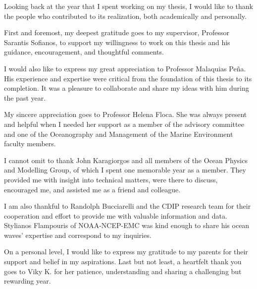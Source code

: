 \documentclass[
11pt, %
greek,english,%
singlespacing, %
headsepline, %
]{MastersDoctoralThesis} %
\begin{document}




\begin{acknowledgements}
\addchaptertocentry{\acknowledgementname} %
Looking back at the year that I spent working on my thesis, I would like to thank the people who contributed to its realization, both academically and personally.

First and foremost, my deepest gratitude goes to my supervisor, Professor Sarantis Sofianos, to support my willingness to work on this thesis and his guidance, encouragement, and thoughtful comments.

I would also like to express my great appreciation to Professor Malaquias  Peña. His experience and expertise were critical from the foundation of this thesis to its completion. It was a pleasure to collaborate and share my ideas with him during the past year.

My sincere appreciation goes to Professor Helena Floca. She was always present and helpful when I needed her support as a member of the advisory committee and one of the Oceanography and Management of the Marine Environment faculty members.

I cannot omit to thank John Karagiorgos and all members of the Ocean Physics and Modelling Group, of which I spent one memorable year as a member. They provided me with insight into technical matters, were there to discuss, encouraged me, and assisted me as a friend and colleague. 

I am also thankful to Randolph Bucciarelli and the CDIP research team for their cooperation and effort to provide me with valuable information and data. Stylianos Flampouris of NOAA-NCEP-EMC was kind enough to share his ocean waves' expertise and correspond to my inquiries.

On a personal level, I would like to express my gratitude to my parents for their support and belief in my aspirations. Last but not least, a heartfelt thank you goes to Viky K.  for her patience, understanding and sharing a challenging but rewarding year.
\end{acknowledgements}

\end{document}
